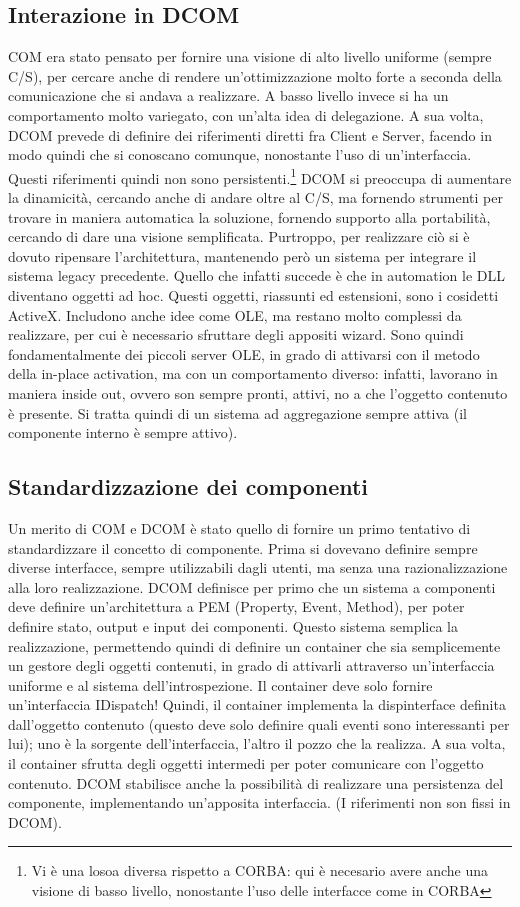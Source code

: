\subsection{Interazione in DCOM}
COM era stato pensato per fornire una visione di alto livello uniforme (sempre C/S), per cercare anche di rendere
un'ottimizzazione molto forte a seconda della comunicazione che si andava a realizzare. A basso livello invece si ha un
comportamento molto variegato, con un'alta idea di delegazione.
A sua volta, DCOM prevede di definire dei riferimenti diretti fra Client e Server, facendo in modo quindi che si conoscano
comunque, nonostante l'uso di un'interfaccia. Questi riferimenti quindi non sono persistenti.\footnote{Vi è una losoa
diversa rispetto a CORBA: qui è necesario avere anche una visione di basso livello, nonostante l'uso delle interfacce
come in CORBA} DCOM si preoccupa di aumentare la dinamicità, cercando anche di andare oltre al C/S, ma fornendo
strumenti per trovare in maniera automatica la soluzione, fornendo supporto alla portabilità, cercando di dare una
visione semplificata. Purtroppo, per realizzare ciò si è dovuto ripensare l'architettura, mantenendo però un sistema per
integrare il sistema legacy precedente.
Quello che infatti succede è che in automation le DLL diventano oggetti ad hoc. Questi oggetti, riassunti ed
estensioni, sono i cosidetti ActiveX. Includono anche idee come OLE, ma restano molto complessi da realizzare, per cui è
necessario sfruttare degli appositi wizard. Sono quindi fondamentalmente dei piccoli server OLE, in grado di attivarsi
con il metodo della in-place activation, ma con un comportamento diverso: infatti, lavorano in maniera inside out,
ovvero son sempre pronti, attivi, no a che l'oggetto contenuto è presente. Si tratta quindi di un sistema ad
aggregazione sempre attiva (il componente interno è sempre attivo).
\subsection{Standardizzazione dei componenti}
Un merito di COM e DCOM è stato quello di fornire un primo tentativo di standardizzare il concetto di componente. Prima
si dovevano definire sempre diverse interfacce, sempre utilizzabili dagli utenti, ma senza una razionalizzazione alla
loro realizzazione.
DCOM definisce per primo che un sistema a componenti deve definire un'architettura a PEM (Property, Event, Method), per
poter definire stato, output e input dei componenti. Questo sistema semplica la realizzazione, permettendo quindi di
definire un container che sia semplicemente un gestore degli oggetti contenuti, in grado di attivarli attraverso
un'interfaccia uniforme e al sistema dell'introspezione. Il container deve solo fornire un'interfaccia IDispatch!
Quindi, il container implementa la dispinterface definita dall'oggetto contenuto (questo deve solo definire quali eventi
sono interessanti per lui); uno è la sorgente dell'interfaccia, l'altro il pozzo che la realizza. A sua volta, il
container sfrutta degli oggetti intermedi per poter comunicare con l'oggetto contenuto.
DCOM stabilisce anche la possibilità di realizzare una persistenza del componente, implementando un'apposita
interfaccia. (I riferimenti non son fissi in DCOM).
